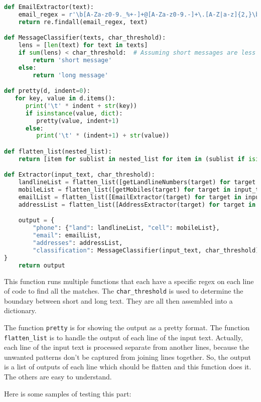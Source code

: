 \documentclass{solutionclass} %
\def\co#1{\texttt{#1}}
\begin{document}
\begin{lstlisting}[language=Python]
def EmailExtractor(text):
    email_regex = r'\b[A-Za-z0-9._%+-]+@[A-Za-z0-9.-]+\.[A-Z|a-z]{2,}\b'
    return re.findall(email_regex, text)

def MessageClassifier(texts, char_threshold):
    lens = [len(text) for text in texts]
    if sum(lens) < char_threshold:  # Assuming short messages are less than 100 characters
        return 'short message'
    else:
        return 'long message'

def pretty(d, indent=0):
   for key, value in d.items():
      print('\t' * indent + str(key))
      if isinstance(value, dict):
         pretty(value, indent+1)
      else:
         print('\t' * (indent+1) + str(value))

def flatten_list(nested_list):
    return [item for sublist in nested_list for item in (sublist if isinstance(sublist, list) else [sublist])]

def Extractor(input_text, char_threshold):
	landlineList = flatten_list([getLandlineNumbers(target) for target in input_text])
	mobileList = flatten_list([getMobiles(target) for target in input_text])
	emailList = flatten_list([EmailExtractor(target) for target in input_text])
	addressList = flatten_list([AddressExtractor(target) for target in input_text])

	output = {
		"phone": {"land": landlineList, "cell": mobileList},
		"email": emailList,
		"addresses": addressList,
		"classification": MessageClassifier(input_text, char_threshold)
}
	return output
\end{lstlisting}

\begin{solution}
This function runs multiple functions that each have a specific regex on each line of code to find all the matches. The \verb*|char_threshold| is used to determine the boundary between short and long text. They are all then assembled into a dictionary.

The function \co{pretty} is for showing the output as a pretty format. The function \co{flatten\_list} is to handle the output of each line of the input text. Actually, each line of the input text is processed separate from another lines, because the unwanted patterns don't be captured from joining lines together. So, the output is a list of outputs of each line which should be flatten and this function does it. The others are easy to understand.

Here is some samples of testing this part:
\end{solution}
\end{document}
